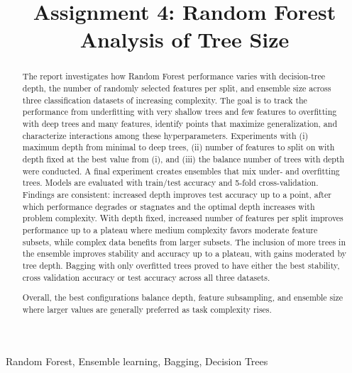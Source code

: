 \documentclass[conference]{IEEEtran}
\begin{document}
\title{Assignment 4: Random Forest Analysis of Tree Size}

\author{
}

\maketitle


\begin{abstract}
The report investigates how Random Forest performance varies with decision-tree depth, the number of randomly selected features per split, and ensemble size across three classification datasets of increasing complexity. The goal is to track the performance from underfitting with very shallow trees and few features to overfitting with deep trees and many features, identify points that maximize generalization, and characterize interactions among these hyperparameters. Experiments with (i) maximum depth from minimal to deep trees, (ii) number of features to split on with depth fixed at the best value from (i), and (iii) the balance number of trees with depth were conducted. A final experiment creates ensembles that mix under- and overfitting trees. Models are evaluated with train/test accuracy and 5-fold cross-validation. Findings are consistent: increased depth improves test accuracy up to a point, after which performance degrades or stagnates and the optimal depth increases with problem complexity. With depth fixed, increased number of features per split improves performance up to a plateau where medium complexity favors moderate feature subsets, while complex data benefits from larger subsets. The inclusion of more trees in the ensemble improves stability and accuracy up to a plateau, with gains moderated by tree depth. Bagging with only overfitted trees proved to have either the best stability, cross validation accuracy or test accuracy across all three datasets. 

  Overall, the best configurations balance depth, feature subsampling, and ensemble size where larger values are generally preferred as 
  task complexity rises. 
\end{abstract}


\begin{IEEEkeywords}
Random Forest, Ensemble learning, Bagging, Decision Trees
\end{IEEEkeywords}
\end{document}
